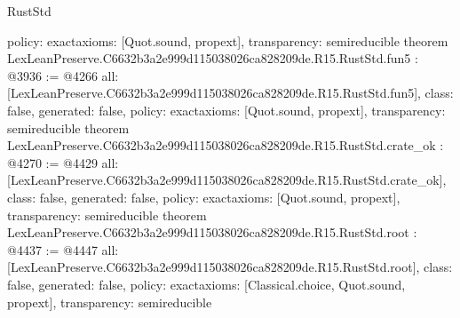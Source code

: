 \begin{lexlean}{RustStd}
\begin{coremodule}
{  policy: exact{axioms: [Quot.sound, propext]},
  transparency: semireducible
}
theorem LexLeanPreserve.C6632b3a2e999d115038026ca828209de.R15.RustStd.fun5 : @3936 := @4266 {
  all: [LexLeanPreserve.C6632b3a2e999d115038026ca828209de.R15.RustStd.fun5],
  class: false,
  generated: false,
  policy: exact{axioms: [Quot.sound, propext]},
  transparency: semireducible
}
theorem LexLeanPreserve.C6632b3a2e999d115038026ca828209de.R15.RustStd.crate_ok : @4270 := @4429 {
  all: [LexLeanPreserve.C6632b3a2e999d115038026ca828209de.R15.RustStd.crate_ok],
  class: false,
  generated: false,
  policy: exact{axioms: [Quot.sound, propext]},
  transparency: semireducible
}
theorem LexLeanPreserve.C6632b3a2e999d115038026ca828209de.R15.RustStd.root : @4437 := @4447 {
  all: [LexLeanPreserve.C6632b3a2e999d115038026ca828209de.R15.RustStd.root],
  class: false,
  generated: false,
  policy: exact{axioms: [Classical.choice, Quot.sound, propext]},
  transparency: semireducible
}


\end{coremodule}
\end{lexlean}
